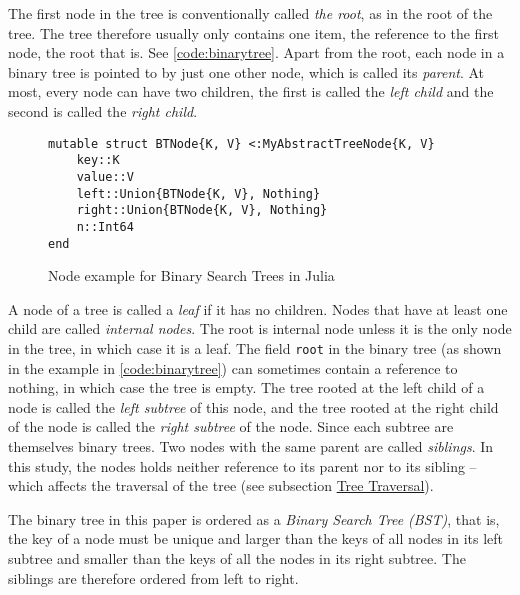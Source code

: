 \documentclass[a4paper, 11pt]{article}
\begin{document}
    The first node in the tree is conventionally called \emph{the root}, as in the root of the tree.
    The tree therefore usually only contains one item, the reference to the first node, the root that is.
    See \autoref{code:binarytree}. Apart from the root, 
    each node in a binary tree is pointed to by just one other node, which is called its \emph{parent}. 
    At most, every node can have two children, the first is called the \emph{left child}
    and the second is called the \emph{right child}.  
    \begin{figure}[h]
        \centering
    \begin{verbatim}
mutable struct BTNode{K, V} <:MyAbstractTreeNode{K, V} 
    key::K
    value::V
    left::Union{BTNode{K, V}, Nothing}
    right::Union{BTNode{K, V}, Nothing}
    n::Int64 
end
    \end{verbatim}
    \caption{Node example for Binary Search Trees in Julia}
    \label{code:node}
    \end{figure}

    \clearpage
    A node of a tree is called a \emph{leaf} if it has no children. Nodes that
    have at least one child are called \emph{internal nodes}. 
    The root is internal node unless it is the only node in the tree, in which case it is a leaf. 
    The field \texttt{root} in the binary tree (as shown in the
    example in \autoref{code:binarytree})
    can sometimes contain a reference to nothing, in which case the tree is empty.
    The tree rooted at the left child
    of a node is called the \emph{left subtree} of this node, and the tree rooted at the
    right child of the node is called the \emph{right subtree} of the node.
    Since each subtree are themselves binary trees. Two nodes with the same 
    parent are called \emph{siblings}. In this study, the nodes holds neither reference to its parent 
    nor to its sibling -- which affects the traversal of the tree 
    (see subsection \hyperref[sec:treetraversal]{Tree Traversal}).

    The binary tree in this paper is ordered as a \emph{Binary Search Tree (BST)}, that is, 
    the key of a node must be unique and larger than the keys of all nodes in
    its left subtree and smaller than the keys of all the nodes in its right
    subtree. The siblings are therefore ordered from left to right.
\end{document}
